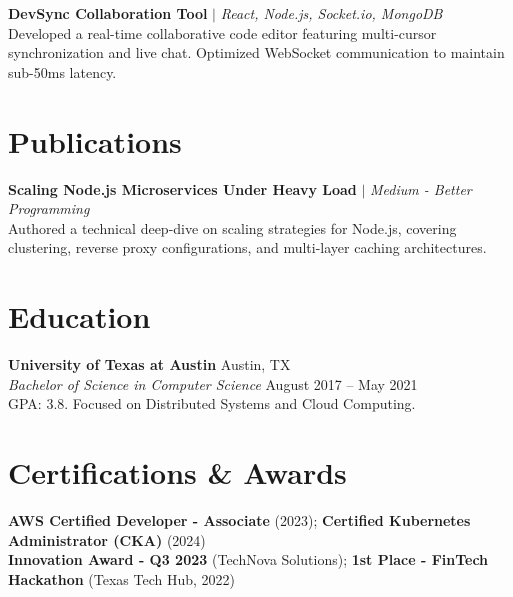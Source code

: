 \documentclass[10pt,a4paper]{article}
\begin{document}
\textbf{DevSync Collaboration Tool} $|$ \textit{React, Node.js, Socket.io, MongoDB} \\
Developed a real-time collaborative code editor featuring multi-cursor synchronization and live chat. Optimized WebSocket communication to maintain sub-50ms latency.

\section{Publications}
\textbf{Scaling Node.js Microservices Under Heavy Load} $|$ \textit{Medium - Better Programming} \\
Authored a technical deep-dive on scaling strategies for Node.js, covering clustering, reverse proxy configurations, and multi-layer caching architectures.

\section{Education}
\textbf{University of Texas at Austin} \hfill Austin, TX \\
\textit{Bachelor of Science in Computer Science} \hfill August 2017 -- May 2021 \\
GPA: 3.8. Focused on Distributed Systems and Cloud Computing.

\section{Certifications \& Awards}
\textbf{AWS Certified Developer - Associate} (2023); \textbf{Certified Kubernetes Administrator (CKA)} (2024) \\
\textbf{Innovation Award - Q3 2023} (TechNova Solutions); \textbf{1st Place - FinTech Hackathon} (Texas Tech Hub, 2022)
\end{document}
